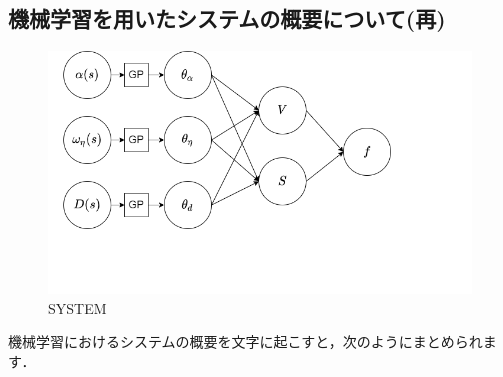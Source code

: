 \documentclass[11pt]{jsarticle}
\begin{document}
		\subsection{機械学習を用いたシステムの概要について(再)}
			\begin{figure}[h!]
				\centering
				\includegraphics[scale=0.5]{./figure/systems.png}
				\caption{SYSTEM}
			\end{figure}
			機械学習におけるシステムの概要を文字に起こすと，次のようにまとめられます．
\end{document}
